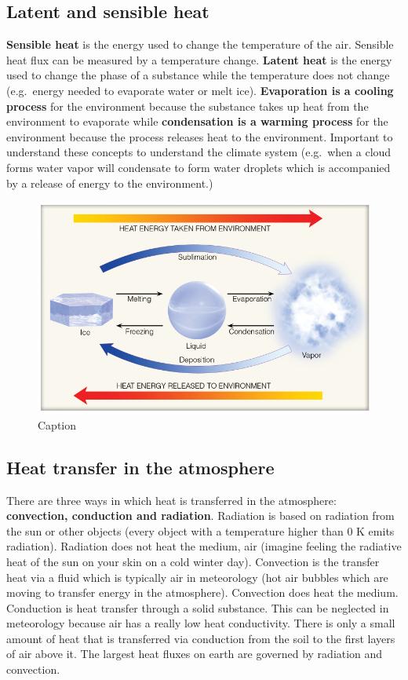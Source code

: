 \documentclass[oneside]{book}
\begin{document}
\subsection{Latent and sensible heat}\label{latent-and-sensible-heat}

\textbf{Sensible heat} is the energy used to change the temperature of
the air. Sensible heat flux can be measured by a temperature change.
\textbf{Latent heat} is the energy used to change the phase of a
substance while the temperature does not change (e.g.~energy needed to
evaporate water or melt ice). \textbf{Evaporation is a cooling process}
for the environment because the substance takes up heat from the
environment to evaporate while \textbf{condensation is a warming
process} for the environment because the process releases heat to the
environment. Important to understand these concepts to understand the
climate system (e.g.~when a cloud forms water vapor will condensate to
form water droplets which is accompanied by a release of energy to the
environment.)

\begin{figure}

{\centering \includegraphics[width=0.7\linewidth]{figures/Figure116} 

}

\caption{Caption}\label{fig:LSheat}
\end{figure}

\subsection{Heat transfer in the
atmosphere}\label{heat-transfer-in-the-atmosphere}

There are three ways in which heat is transferred in the atmosphere:
\textbf{convection, conduction and radiation}. Radiation is based on
radiation from the sun or other objects (every object with a temperature
higher than 0 K emits radiation). Radiation does not heat the medium,
air (imagine feeling the radiative heat of the sun on your skin on a
cold winter day). Convection is the transfer heat via a fluid which is
typically air in meteorology (hot air bubbles which are moving to
transfer energy in the atmosphere). Convection does heat the medium.
Conduction is heat transfer through a solid substance. This can be
neglected in meteorology because air has a really low heat conductivity.
There is only a small amount of heat that is transferred via conduction
from the soil to the first layers of air above it. The largest heat
fluxes on earth are governed by radiation and convection.
\end{document}
